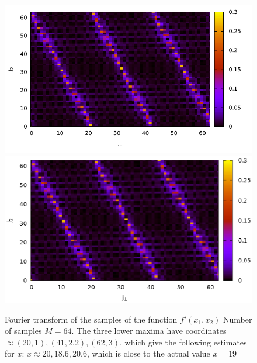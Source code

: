 \begin{figure}
\centering

\ifpdf
\includegraphics[angle=0]
{./discretlog/picdiscretlog4.pdf}
\else
\includegraphics[angle=0]
{./discretlog/picdiscretlog4.eps}
\fi

%

\caption{Fourier transform of the samples of the function 
$f'(x_1, x_2)$
Number of samples $M=64$. The three lower maxima have coordinates $\approx (20,1), (41,2.2), (62,
3)$, which give the following estimates for $x$: $x \approx 20, 18.6, 20.6$,
which is close to the actual value $x = 19$
} 
\label{fig:dl4}
\end{figure}
